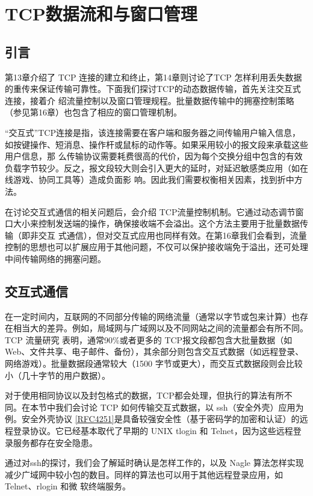 \chapter{TCP数据流和与窗口管理}
\minitoc

\section{引言}
第13章介绍了 TCP 连接的建立和终止，第14章则讨论了TCP 怎样利用丢失数据的重传来保证传输可靠性。下面我们探讨TCP的动态数据传输，首先关注交互式连接，接着介
绍流量控制以及窗口管理规程。批量数据传输中的拥塞控制策略（参见第16章）也包含了相应的窗口管理机制。

“交互式”TCP连接是指，该连接需要在客户端和服务器之间传输用户输入信息，如按键操作、短消息、操作杆或鼠标的动作等。如果采用较小的报文段来承载这些用户信息，那
么传输协议需要耗费很高的代价，因为每个交换分组中包含的有效负载字节较少。反之，报文段较大则会引入更大的延时，对延迟敏感类应用（如在线游戏、协同工具等）造成负面影
响。因此我们需要权衡相关因素，找到折中方法。

在讨论交互式通信的相关问题后，会介绍 TCP流量控制机制。它通过动态调节窗口大小来控制发送端的操作，确保接收端不会溢出。这个方法主要用于批量数据传输（即非交互
式通信），但对交互式应用也同样有效。在第16章我们会看到，流量控制的思想也可以扩展应用于其他问题，不仅可以保护接收端免于溢出，还可处理中间传输网络的拥塞问题。
\section{交互式通信}

在一定时间内，互联网的不同部分传输的网络流量（通常以字节或包来计算）也存在相当大的差异。例如，局域网与广域网以及不同网站之间的流量都会有所不同。TCP 流量研究
表明，通常90\%或者更多的 TCP报文段都包含大批量数据（如Web、文件共享、电子邮件、备份），其余部分则包含交互式数据（如远程登录、网络游戏）。批量数据段通常较大（1500
字节或更大），而交互式数据段则会比较小（几十字节的用户数据）。

对于使用相同协议以及封包格式的数据，TCP都会处理，但执行的算法有所不同。在本节中我们会讨论 TCP 如何传输交互式数据，以 ssh（安全外壳）应用为例。安全外壳协议
\href{https://www.rfc-editor.org/rfc/rfc4251}{[RFC4251]}是具备较强安全性（基于密码学的加密和认证）的远程登录协议。它已经基本取代了早期的 UNIX tlogin 和 Telnet，因为这些远程登录服务都存在安全隐患。

通过对ssh的探讨，我们会了解延时确认是怎样工作的，以及 Nagle 算法怎样实现减少广域网中较小包的数目。同样的算法也可以用于其他远程登录应用，如 Telnet、rlogin 和微
软终端服务。

